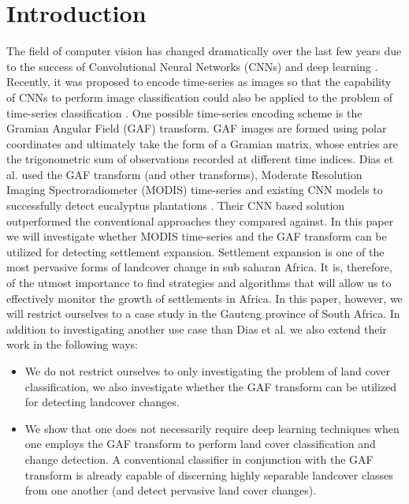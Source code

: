 \documentclass{article}
\begin{document}
\section{Introduction}
\label{sec:intro}
The field of computer vision has changed dramatically over the last few years due to the success of Convolutional Neural Networks (CNNs) and deep learning \cite{goodfellow2016}.  Recently, it was proposed to encode time-series as images so that the capability of CNNs to perform image classification could also be applied to the problem of time-series classification \cite{wang2015}. One possible time-series encoding scheme is the Gramian Angular Field (GAF) transform. GAF images are formed using polar coordinates and ultimately take the form of a Gramian matrix, whose entries are the trigonometric sum of observations recorded at different time indices.  Dias et al. used the GAF transform (and other transforms), Moderate Resolution Imaging Spectroradiometer (MODIS) time-series and existing CNN models to successfully detect eucalyptus plantations \cite{dias2019}. Their CNN based solution outperformed the conventional approaches they compared against. In this paper we will investigate whether MODIS time-series and the GAF transform can be utilized for detecting settlement expansion. Settlement expansion is one of the most pervasive forms of landcover change in sub saharan Africa. It is, therefore, of the utmost importance to find strategies and algorithms that will allow us to effectively monitor the growth of settlements in Africa. In this paper, however, we will restrict ourselves to a case study in the Gauteng province of South Africa. In addition to investigating another use case than Dias et al. we also extend their work in the following ways:
\begin{itemize}
 \item We do not restrict ourselves to only investigating the problem of land cover classification, we also investigate whether the GAF transform can be utilized for detecting landcover changes.
 \item We show that one does not necessarily require deep learning techniques when one employs the GAF transform to perform land cover classification and change detection. A conventional classifier in conjunction with the GAF transform is already capable of discerning highly separable landcover classes from one another (and detect pervasive land cover changes).
\end{itemize}
  
\end{document}
